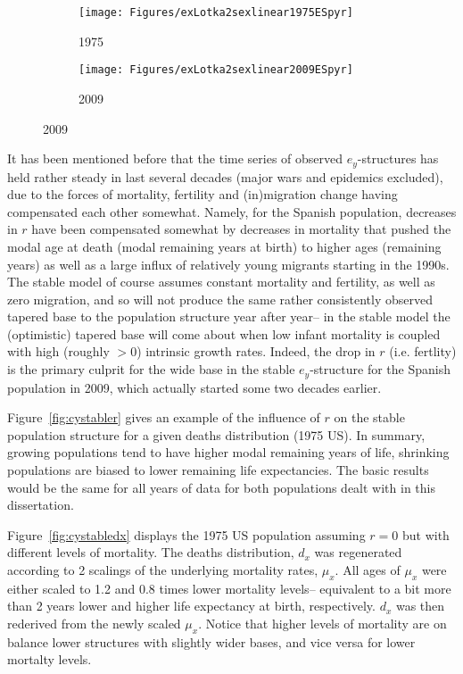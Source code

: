 \begin{figure}[!ht]
        \centering
        \caption{Spain, stable ($\sigma = 0.05$) versus initial
        $e_y$-structures, 1975 and 2009}
        \label{fig:stablevsinitES}
        \begin{subfigure}
                \centering
                \caption*{1975}
                \texttt{[image: Figures/exLotka2sexlinear1975ESpyr]}
        \end{subfigure}
        \begin{subfigure}
                \centering
                \caption*{2009}
                \texttt{[image: Figures/exLotka2sexlinear2009ESpyr]}
        \end{subfigure}
         
\end{figure}
\FloatBarrier
It has been mentioned before that the time series of observed $e_y$-structures
has held rather steady in last several decades (major wars and epidemics excluded),
due to the forces of mortality, fertility and (in)migration change having
compensated each other somewhat. Namely, for the Spanish population, decreases
in $r$ have been compensated somewhat by decreases in mortality that pushed the modal age at
death (modal remaining years at birth) to higher ages (remaining years) as well
as a large influx of relatively young migrants starting in the 1990s. The stable
model of course assumes constant mortality and fertility, as well as zero
migration, and so will not produce the same rather consistently observed tapered
base to the population structure year after year-- in the stable model the
(optimistic) tapered base will come about when low infant mortality is coupled
with high (roughly $>0$) intrinsic growth rates. Indeed, the drop in $r$ (i.e.
fertlity) is the primary culprit for the wide base in the stable
$e_y$-structure for the Spanish population in 2009, which actually started some
two decades earlier. 

Figure~\ref{fig:cystabler} gives an example of the
influence of $r$ on the stable population structure for a given deaths
distribution (1975 US). In summary, growing populations tend to have higher
modal remaining years of life, shrinking populations are biased to lower
remaining life expectancies. The basic results would be the same for all years
of data for both populations dealt with in this dissertation.

Figure~\ref{fig:cystabledx} displays the 1975 US population assuming $r=0$ but
with different levels of mortality. The deaths distribution, $d_x$ was
regenerated according to 2 scalings of the underlying mortality rates, $\mu_x$.
All ages of $\mu_x$ were either scaled to 1.2 and 0.8 times lower mortality
levels-- equivalent to a bit more than 2 years lower and higher life expectancy 
at birth, respectively. $d_x$ was then rederived from the
newly scaled $\mu_x$. Notice that higher levels of mortality are on balance
lower structures with slightly wider bases, and vice versa for lower mortalty
levels. 


